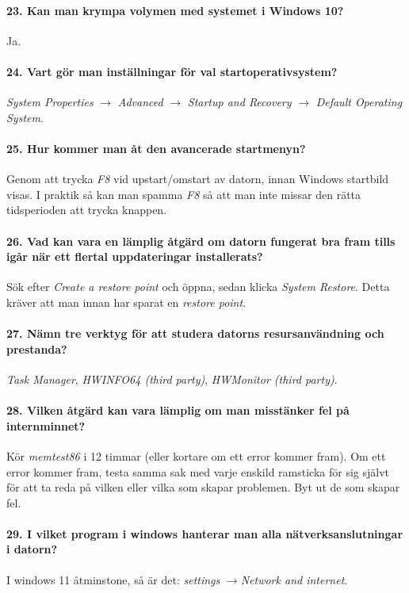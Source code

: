\paragraph{23. Kan man krympa volymen med systemet i Windows 10?} Ja. 

\paragraph{24. Vart gör man inställningar för val startoperativsystem?}
\textit{System Properties} $\rightarrow$ \textit{Advanced} $\rightarrow$ \textit{Startup and Recovery} $\rightarrow$ \textit{Default Operating System}.

\paragraph{25. Hur kommer man åt den avancerade startmenyn?}
Genom att trycka \textit{F8} vid upstart/omstart av datorn, innan Windows startbild visas. I praktik så kan man spamma \textit{F8} så att man inte missar den rätta tidsperioden att trycka knappen.

\paragraph{26. Vad kan vara en lämplig åtgärd om datorn fungerat bra fram tills igår när ett flertal uppdateringar installerats?}
Sök efter \textit{Create a restore point} och öppna, sedan klicka \textit{System Restore}. Detta kräver att man innan har sparat en \textit{restore point}.

\paragraph{27. Nämn tre verktyg för att studera datorns resursanvändning och prestanda?}
\textit{Task Manager}, \textit{HWINFO64 (third party)}, \textit{HWMonitor (third party)}.

\paragraph{28. Vilken åtgärd kan vara lämplig om man misstänker fel på internminnet?}
Kör \textit{memtest86} i 12 timmar (eller kortare om ett error kommer fram). Om ett error kommer fram, testa samma sak med varje enskild ramsticka för sig självt för att ta reda på vilken eller vilka som skapar problemen. Byt ut de som skapar fel.

\paragraph{29. I vilket program i windows hanterar man alla nätverksanslutningar i datorn?}
I windows 11 åtminstone, så är det: \textit{settings} $\rightarrow$\textit{Network and internet}.

